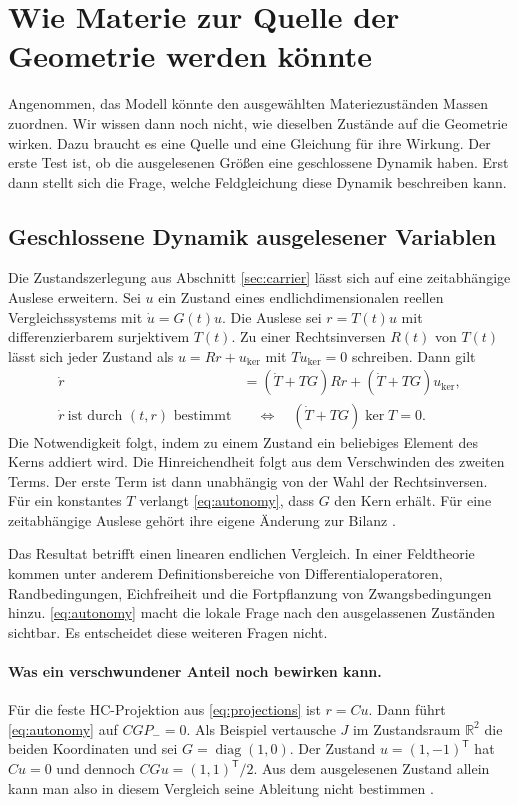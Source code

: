 \section{Wie Materie zur Quelle der Geometrie werden könnte}
\label{sec:geometry}

Angenommen, das Modell könnte den ausgewählten Materiezuständen Massen zuordnen. Wir wissen dann noch nicht, wie dieselben Zustände auf die Geometrie wirken. Dazu braucht es eine Quelle und eine Gleichung für ihre Wirkung. Der erste Test ist, ob die ausgelesenen Größen eine geschlossene Dynamik haben. Erst dann stellt sich die Frage, welche Feldgleichung diese Dynamik beschreiben kann.

\subsection{Geschlossene Dynamik ausgelesener Variablen}

Die Zustandszerlegung aus Abschnitt \ref{sec:carrier} lässt sich auf eine zeitabhängige Auslese erweitern. Sei \(u\) ein Zustand eines endlichdimensionalen reellen Vergleichssystems mit \(\dot u=G(t)u\). Die Auslese sei \(r=T(t)u\) mit differenzierbarem surjektivem \(T(t)\). Zu einer Rechtsinversen \(R(t)\) von \(T(t)\) lässt sich jeder Zustand als \(u=Rr+u_{\ker}\) mit \(Tu_{\ker}=0\) schreiben. Dann gilt
\begin{align}
 \dot r&=(\dot T+TG)Rr+(\dot T+TG)u_{\ker},\\
 \dot r\ \text{ist durch }(t,r)\text{ bestimmt}
      &\quad\Longleftrightarrow\quad (\dot T+TG)\ker T=0 .
 \label{eq:autonomy}
\end{align}
Die Notwendigkeit folgt, indem zu einem Zustand ein beliebiges Element des Kerns addiert wird. Die Hinreichendheit folgt aus dem Verschwinden des zweiten Terms. Der erste Term ist dann unabhängig von der Wahl der Rechtsinversen. Für ein konstantes \(T\) verlangt \eqref{eq:autonomy}, dass \(G\) den Kern erhält. Für eine zeitabhängige Auslese gehört ihre eigene Änderung zur Bilanz \cite{physics}.

Das Resultat betrifft einen linearen endlichen Vergleich. In einer Feldtheorie kommen unter anderem Definitionsbereiche von Differentialoperatoren, Randbedingungen, Eichfreiheit und die Fortpflanzung von Zwangsbedingungen hinzu. \eqref{eq:autonomy} macht die lokale Frage nach den ausgelassenen Zuständen sichtbar. Es entscheidet diese weiteren Fragen nicht.

\paragraph{Was ein verschwundener Anteil noch bewirken kann.}
Für die feste HC-Projektion aus \eqref{eq:projections} ist \(r=Cu\). Dann führt \eqref{eq:autonomy} auf \(CGP_-=0\). Als Beispiel vertausche \(J\) im Zustandsraum \(\mathbb R^2\) die beiden Koordinaten und sei \(G=\operatorname{diag}(1,0)\). Der Zustand \(u=(1,-1)^{\mathsf T}\) hat \(Cu=0\) und dennoch \(CGu=(1,1)^{\mathsf T}/2\). Aus dem ausgelesenen Zustand allein kann man also in diesem Vergleich seine Ableitung nicht bestimmen \cite{physics}.

